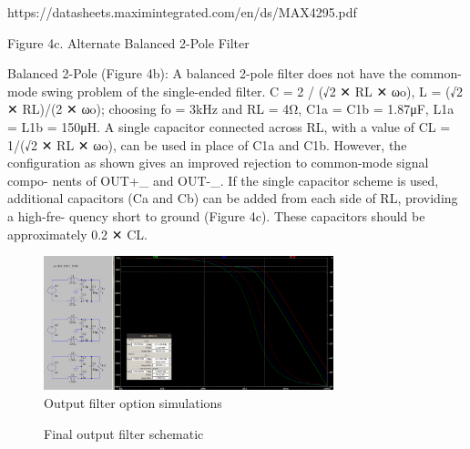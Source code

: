 \documentclass[11pt]{article}
\begin{document}
{https://datasheets.maximintegrated.com/en/ds/MAX4295.pdf

Figure 4c. Alternate Balanced 2-Pole Filter

Balanced 2-Pole (Figure 4b):
A  balanced  2-pole  filter  does  not  have  the  common-
mode swing problem of the single-ended filter.
C = 2 / (√2 ✕ RL ✕ ωo), L = (√2 ✕ RL)/(2 ✕ ωo); choosing
fo =  3kHz  and  RL =  4Ω,  C1a  =  C1b  =  1.87μF,  L1a  =
L1b = 150μH.
A single capacitor connected across RL, with a value of
CL = 1/(√2 ✕ RL ✕ ωo), can be used in place of C1a and
C1b.  However,  the  configuration  as  shown  gives  an
improved  rejection  to  common-mode  signal  compo-
nents  of  OUT+_  and  OUT-_.    If  the  single  capacitor
scheme is used, additional capacitors (Ca and Cb) can
be  added  from  each  side  of  RL,  providing  a  high-fre-
quency  short  to  ground  (Figure  4c).  These  capacitors
should be approximately 0.2 ✕ CL.

\begin{figure}[h!]
  \centering
  \includegraphics[width=0.75\textwidth]{img/output_filter_sim.png}
  \caption{Output filter option simulations}
  \label{F:opf_sim}
\end{figure}

\begin{figure}[h!]
  \centering
  \caption{Final output filter schematic}
  \label{F:opf_schem}
\end{figure}


}
\end{document}
